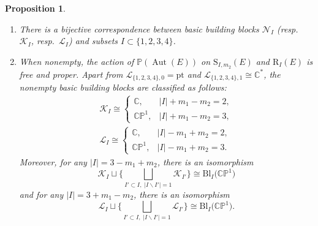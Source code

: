 \documentclass[10pt,a4paper]{amsart}
\newcommand{\field}[1]{\ensuremath{\mathbb{#1}}}
\newcommand{\CC}{\field{C}}
\newcommand{\PP}{\field{P}}
\newcommand{\curly}[1]{\mathscr{#1}}
\newcommand{\cK}{\curly{K}}
\newcommand{\cL}{\curly{L}}
\newcommand{\cN}{\curly{N}}
\DeclareMathOperator{\Aut}{Aut}
\numberwithin{equation}{section}
\newtheorem{Proposition}[Theorem]{Proposition}
 { \theoremstyle{definition}
\newtheorem{Definition}[Theorem]{Definition}
\newtheorem{Note}[Theorem]{Note}
\newtheorem{Example}[Theorem]{Example}
\newtheorem{Remark}[Theorem]{Remark} }
\begin{document}
\begin{Proposition}\label{prop:line-orbit}\quad
\begin{enumerate}\itemsep=0pt
\item[$(i)$] There is a bijective correspondence between basic building blocks $\cN_{I}$ (resp.~$\cK_{I}$, resp.~$\cL_{I}$) and subsets $I\subset\{1,2,3,4\}$.
\item[$(ii)$] When nonempty, the action of $\PP(\Aut(E))$ on $\mathrm{S}_{I,m_{2}}(E)$ and $\mathrm{R}_{I}(E)$ is free and proper. Apart from $\cL_{\{1,2,3,4\},0} = \mathrm{pt}$ and $\cL_{\{1,2,3,4\},1}\cong\CC^{*}$, the nonempty basic building blocks are classified as follows:
\begin{gather*}
\cK_{I} \cong\begin{cases}
\CC, & \vert I\vert + m_{1}-m_{2} = 2,
\\
\CC\PP^{1}, & \vert I\vert + m_{1} - m_{2} = 3,
\end{cases}
\\
\cL_{I} \cong\begin{cases}
\CC,& \vert I\vert - m_{1} + m_{2} = 2,
\\
\CC\PP^{1}, & \vert I\vert - m_{1} + m_{2} = 3.
\end{cases}
\end{gather*}
Moreover, for any $\vert I\vert = 3 - m_{1} + m_{2}$, there is an isomorphism
\[
\cK_{I}\sqcup \bigg\{\bigsqcup_{I'\subset I,\; \vert I\backslash I'\vert = 1}\cK_{I'}\bigg\}\cong \mathrm{Bl}_{I}\big(\CC\PP^{1}\big)
\]
and for any $\vert I\vert = 3 + m_{1} - m_{2}$, there is an isomorphism
\[
\cL_{I}\sqcup\bigg\{\bigsqcup_{I'\subset I,\; \vert I\backslash I'\vert = 1}\cL_{I'}\bigg\}\cong \mathrm{Bl}_{I}\big(\CC\PP^{1}\big).
\]
\end{enumerate}
\end{Proposition}
\end{document}
